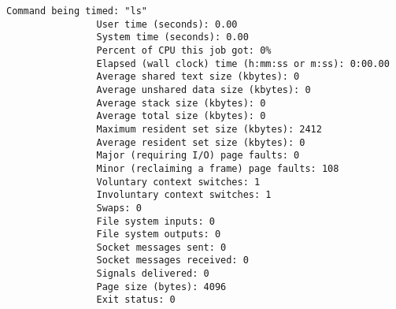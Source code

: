 \documentclass[a4paper, 11pt, answers]{exam}
\begin{document}
\begin{questions}
\begin{parts}
\begin{solution}
\begin{Verbatim}[label={\$ /usr/bin/time -v ls}, fontsize=\small]
                Command being timed: "ls"
                User time (seconds): 0.00
                System time (seconds): 0.00
                Percent of CPU this job got: 0%
                Elapsed (wall clock) time (h:mm:ss or m:ss): 0:00.00
                Average shared text size (kbytes): 0
                Average unshared data size (kbytes): 0
                Average stack size (kbytes): 0
                Average total size (kbytes): 0
                Maximum resident set size (kbytes): 2412
                Average resident set size (kbytes): 0
                Major (requiring I/O) page faults: 0
                Minor (reclaiming a frame) page faults: 108
                Voluntary context switches: 1
                Involuntary context switches: 1
                Swaps: 0
                File system inputs: 0
                File system outputs: 0
                Socket messages sent: 0
                Socket messages received: 0
                Signals delivered: 0
                Page size (bytes): 4096
                Exit status: 0
        \end{Verbatim}
      \end{solution}
    \end{parts}
  \end{questions}
\end{document}
